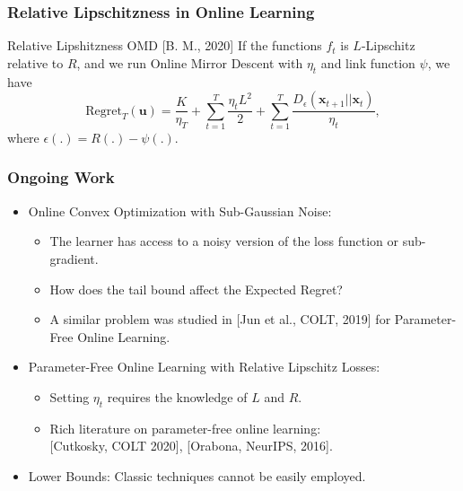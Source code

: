 \documentclass[usenames,dvipsnames, 10pt]{beamer}
\newcommand{\uu}{\mathbf{u}}
\newcommand{\x}{\mathbf{x}}
\begin{document}
\begin{frame}
	\frametitle{Relative Lipschitzness in Online Learning}	
	\begin{block}{Relative Lipshitzness OMD {\small [B. M., 2020]}}
		If the functions $f_t$ is $L$-Lipschitz relative to $R$, and we run Online Mirror Descent with $\eta_t$ and link function $\psi$, we have
		\begin{equation*}
			\mathrm{Regret}_T(\uu) = \frac{K}{\eta_T}+\sum_{t = 1}^{T} \frac{\eta_t L^2}{2} + \sum_{t = 1}^{T} \frac{D_\epsilon(\x_{t+1}||\x_{t})}{\eta_t},
		\end{equation*}
		where $\epsilon(.) = R(.) - \psi(.)$.
	\end{block}
\end{frame}

\begin{frame}
	\frametitle{Ongoing Work}	
	\begin{itemize}
		\item Online Convex Optimization with {\color{brown}Sub-Gaussian Noise}:
		\begin{itemize}
			\item The learner has access to a noisy version of the loss function or sub-gradient.
			\item How does the tail bound affect the Expected Regret?
			\item A similar problem was studied in \small{[Jun et al., COLT, 2019]} for Parameter-Free Online Learning.
		\end{itemize}
		\pause
		\vspace{0.1cm}
		
		\item {\color{brown}Parameter-Free} Online Learning with Relative Lipschitz Losses:
		\begin{itemize}
			\item Setting $\eta_t$ requires the knowledge of $L$ and $R$.
			\item Rich literature on parameter-free online learning:\\ {\small [Cutkosky, COLT 2020], [Orabona, NeurIPS, 2016].}
		\end{itemize}
		\pause
		\vspace{0.1cm}
		
		\item {\color{brown}Lower Bounds}: Classic techniques cannot be easily employed.
	\end{itemize}
\end{frame}
\end{document}
